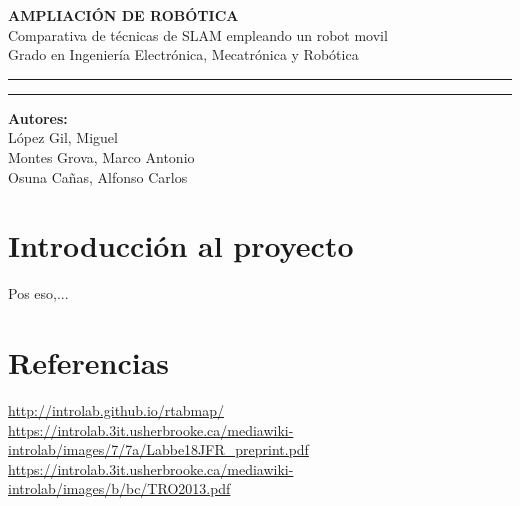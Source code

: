 \documentclass[a4paper,twoside]{article}
\begin{document}
\begin{titlepage}
\centering
\Huge{\textbf{AMPLIACIÓN DE ROBÓTICA}} \\
\Huge{Comparativa de técnicas de SLAM empleando un robot movil}\\

\vspace{1cm}
\LARGE{Grado en Ingeniería Electrónica, Mecatrónica y Robótica}\\
\rule{\textwidth}{0.1mm}
\large{\tableofcontents}
\vspace{1cm}
\rule{\textwidth}{0.1mm}
\Large{\textbf{Autores:} \\
                         López Gil, Miguel \\
                         Montes Grova, Marco Antonio\\
                         Osuna Cañas, Alfonso Carlos}
\end{titlepage}
\newpage

\section{Introducción al proyecto}
Pos eso,...

\newpage


\newpage


\newpage


\newpage
\section{Referencias}


\url{http://introlab.github.io/rtabmap/} \\
\url{https://introlab.3it.usherbrooke.ca/mediawiki-introlab/images/7/7a/Labbe18JFR_preprint.pdf} \\
\url{https://introlab.3it.usherbrooke.ca/mediawiki-introlab/images/b/bc/TRO2013.pdf}
\end{document}
